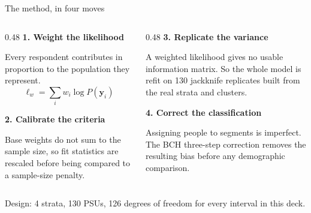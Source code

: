 \documentclass[
  ignorenonframetext,
  aspectratio=169,
]{beamer}
\newcommand{\kicker}[1]{\par\noindent{\footnotesize\color{vteal}\textbf{\MakeUppercase{#1}}}\par\vspace{0.4em}}
\begin{document}
\begin{frame}[shrink]{The method, in four moves}
\label{the-method-in-four-moves}
\kicker{method, part two}

\footnotesize

\begin{columns}[T]
\begin{column}{0.48\textwidth}
\textbf{1. Weight the likelihood}

Every respondent contributes in proportion to the population they represent.
$$\ell_w = \sum_i w_i \log P(\mathbf{y}_i)$$

\vspace{0.5em}
\textbf{2. Calibrate the criteria}

Base weights do not sum to the sample size, so fit statistics are rescaled before being compared to a sample-size penalty.
\end{column}
\begin{column}{0.48\textwidth}
\textbf{3. Replicate the variance}

A weighted likelihood gives no usable information matrix. So the whole model is refit on 130 jackknife replicates built from the real strata and clusters.

\vspace{0.5em}
\textbf{4. Correct the classification}

Assigning people to segments is imperfect. The BCH three-step correction removes the resulting bias before any demographic comparison.
\end{column}
\end{columns}

\vspace{0.5em}
\begin{center}
\small Design: 4 strata, 130 PSUs, 126 degrees of freedom for every interval in this deck.
\end{center}

\end{frame}
\end{document}
